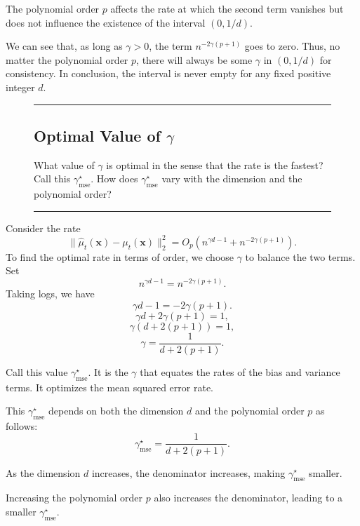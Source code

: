 \documentclass{article}
\newenvironment{colorparagraph}[1]{\par\color{#1}}{\par}
\begin{document}
The polynomial order \( p \) affects the rate at which the second term vanishes but does not influence the existence of the interval \((0, 1/d)\).

We can see that, as long as \(\gamma > 0\), the term \( n^{-2\gamma(p+1)} \) goes to zero. Thus, no matter the polynomial order \( p \), there will always be some \(\gamma\) in \((0, 1/d)\) for consistency. In conclusion, the interval is never empty for any fixed positive integer \( d \).
  
\begin{figure}[H]
  \begin{colorparagraph}{questioncolor}
  \rule{\textwidth}{0.5pt}
  \label{q1d}
  \subsection{Optimal Value of \(\gamma\)}
  
  What value of \( \gamma \) is optimal in the sense that the rate is the fastest? Call this \( \gamma^\star_{\text{mse}} \). How does \( \gamma^\star_{\text{mse}} \) vary with the dimension and the polynomial order?
  
  \rule{\textwidth}{0.5pt}
  \end{colorparagraph}
\end{figure}

Consider the rate
\[
\|\hat{\mu}_t(\mathbf{x}) - \mu_t(\mathbf{x})\|_2^2 = O_p\left( n^{\gamma d - 1} + n^{-2\gamma(p+1)} \right).
\]
To find the optimal rate in terms of order, we choose \(\gamma\) to balance the two terms. Set
\[
n^{\gamma d - 1} = n^{-2\gamma(p+1)}.
\]
Taking logs, we have
\[
\gamma d - 1 = -2\gamma(p+1).
\]
\[
\gamma d + 2\gamma(p+1) = 1,
\]
\[
\gamma (d + 2(p+1)) = 1,
\]
\[
\gamma = \frac{1}{d + 2(p+1)}.
\]

Call this value \(\gamma^\star_{\text{mse}}\). It is the \(\gamma\) that equates the rates of the bias and variance terms. It optimizes the mean squared error rate.

This \(\gamma^\star_{\text{mse}}\) depends on both the dimension \( d \) and the polynomial order \( p \) as follows:
\[
\gamma^\star_{\text{mse}} = \frac{1}{d + 2(p+1)}.
\]

As the dimension \( d \) increases, the denominator increases, making \(\gamma^\star_{\text{mse}}\) smaller.

Increasing the polynomial order \( p \) also increases the denominator, leading to a smaller \(\gamma^\star_{\text{mse}}\).
\end{document}
